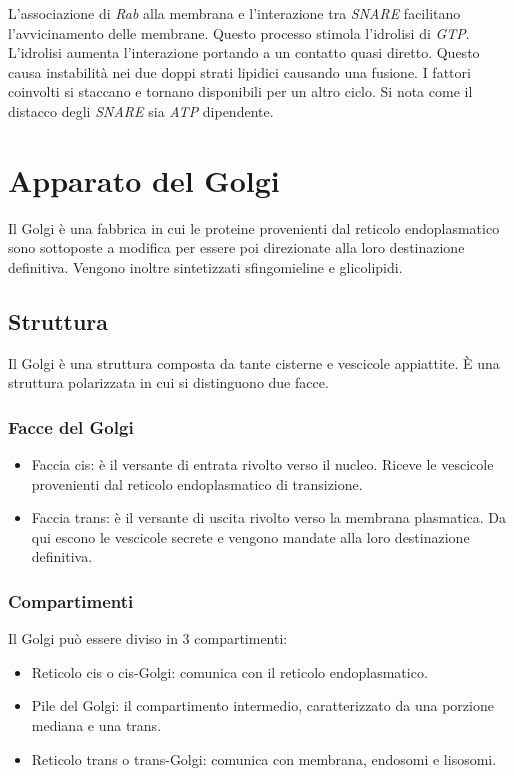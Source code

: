 			L'associazione di \emph{Rab} alla membrana e l'interazione tra \emph{SNARE} facilitano l'avvicinamento delle membrane.
			Questo processo stimola l'idrolisi di \emph{GTP}.
			L'idrolisi aumenta l'interazione portando a un contatto quasi diretto.
			Questo causa instabilit\`a nei due doppi strati lipidici causando una fusione.
			I fattori coinvolti si staccano e tornano disponibili per un altro ciclo.
			Si nota come il distacco degli \emph{SNARE} sia \emph{ATP} dipendente.

\section{Apparato del Golgi}
Il Golgi \`e una fabbrica in cui le proteine provenienti dal reticolo endoplasmatico sono sottoposte a modifica per essere poi direzionate alla loro destinazione definitiva.
Vengono inoltre sintetizzati sfingomieline e glicolipidi.

	\subsection{Struttura}
	Il Golgi \`e una struttura composta da tante cisterne e vescicole appiattite.
	\`E una struttura polarizzata in cui si distinguono due facce.

		\subsubsection{Facce del Golgi}
		\begin{multicols}{2}
			\begin{itemize}
				\item Faccia cis: \`e il versante di entrata rivolto verso il nucleo.
					Riceve le vescicole provenienti dal reticolo endoplasmatico di transizione.
				\item Faccia trans: \`e il versante di uscita rivolto verso la membrana plasmatica.
					Da qui escono le vescicole secrete e vengono mandate alla loro destinazione definitiva.
			\end{itemize}
		\end{multicols}

		\subsubsection{Compartimenti}
		Il Golgi pu\`o essere diviso in $3$ compartimenti:
		\begin{multicols}{2}
			\begin{itemize}
				\item Reticolo cis o cis-Golgi: comunica con il reticolo endoplasmatico.
				\item Pile del Golgi: il compartimento intermedio, caratterizzato da una porzione mediana e una trans.
				\item Reticolo trans o trans-Golgi: comunica con membrana, endosomi e lisosomi.
			\end{itemize}
		\end{multicols}

